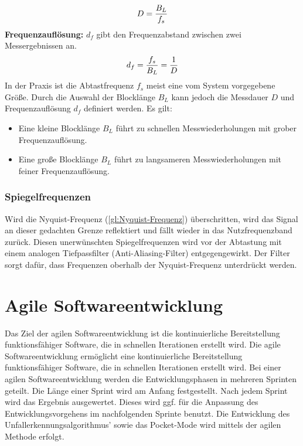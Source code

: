 \begin{align}
	\centering
	D = \frac{B_L}{f_s}
	\label{gl:Messdauer}
\end{align}
\textbf{Frequenzauflösung:} $d_f$ gibt den Frequenzabstand zwischen zwei Messergebnissen an.
\begin{align}
	\centering
	d_f = \frac{f_s}{B_L} = \frac{1}{D}
	\label{gl:Frequenzaufloesung}
\end{align}
In der Praxis ist die Abtastfrequenz $f_s$ meist eine vom System vorgegebene Größe. Durch die Auswahl der Blocklänge $B_L$ kann jedoch die Messdauer $D$ und Frequenzauflösung $d_f$ definiert werden. Es gilt:\\
\begin{itemize}
	\item Eine kleine Blocklänge $B_L$ führt zu schnellen Messwiederholungen mit grober Frequenzauflösung.
	\item Eine große Blocklänge $B_L$ führt zu langsameren Messwiederholungen mit feiner Frequenzauflösung.
\end{itemize}
\subsubsection{Spiegelfrequenzen}
Wird die Nyquist-Frequenz (\autoref{gl:Nyquist-Frequenz}) überschritten, wird das Signal an dieser gedachten Grenze reflektiert und fällt wieder in das Nutzfrequenzband zurück. Diesen unerwünschten Spiegelfrequenzen wird vor der Abtastung mit einem analogen Tiefpassfilter (Anti-Aliasing-Filter) entgegengewirkt. Der Filter sorgt dafür, dass Frequenzen oberhalb der Nyquist-Frequenz unterdrückt werden. \citep{NTIAudioFFT}\citep{WeissteinFFT}






%
%
%
%
%
%
%



\section{Agile Softwareentwicklung}\label{abs:MethodenderSoftwareentwicklung}
Das Ziel der agilen Softwareentwicklung ist die kontinuierliche Bereitstellung funktionsfähiger Software, die in schnellen Iterationen erstellt wird. 
Die agile Softwareentwicklung ermöglicht eine kontinuierliche Bereitstellung funktionsfähiger Software, die in schnellen Iterationen erstellt wird. Bei einer agilen Softwareentwicklung werden die Entwicklungsphasen in mehreren Sprinten geteilt. Die Länge einer Sprint wird am Anfang festgestellt. Nach jedem Sprint wird das Ergebnis ausgewertet. Dieses wird ggf. für die Anpassung des Entwicklungsvorgehens im nachfolgenden Sprinte benutzt\citep{Brunskill2019}.
Die Entwicklung des Unfallerkennungsalgorithmus' sowie das Pocket-Mode wird mittels der agilen Methode erfolgt. 


